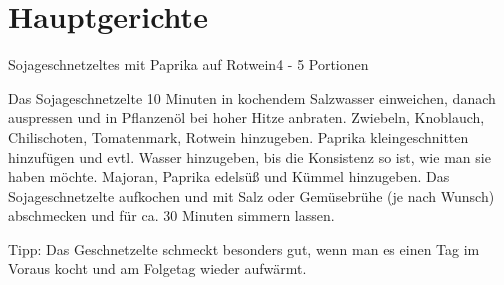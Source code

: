 \documentclass[a4paper,10pt]{article}
\begin{document}
    \newpage
    
    
    \section{Hauptgerichte}
    
    \begin{recipe}{Sojageschnetzeltes mit Paprika auf Rotwein}{4 
           - 5 Portionen}{}          
                   
        \freeform \hfill 
 
	Das Sojageschnetzelte 10 Minuten in kochendem Salzwasser einweichen, danach 
	auspressen und in Pflanzenöl bei hoher Hitze anbraten.
	Zwiebeln, Knoblauch, Chilischoten, Tomatenmark, Rotwein hinzugeben. Paprika 
	kleingeschnitten hinzufügen und evtl. Wasser hinzugeben, bis die Konsistenz so 
	ist, wie man sie haben möchte. Majoran, Paprika edelsüß und Kümmel hinzugeben. 
	Das Sojageschnetzelte aufkochen und mit Salz oder Gemüsebrühe (je nach Wunsch) 
	abschmecken und für ca. 30 Minuten simmern lassen.

	\freeform Tipp: Das Geschnetzelte schmeckt besonders gut, wenn man es einen 
	Tag im Voraus kocht und am Folgetag wieder aufwärmt.
    \end{recipe}
    
\end{document}
